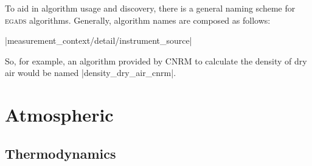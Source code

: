 \documentclass[a4paper,11pt]{report}
\newcommand{\egads}{\textsc{egads} }
\begin{document}
To aid in algorithm usage and discovery, there is a general naming scheme for \egads algorithms. Generally, algorithm names are composed as follows: 

|{measurement}_{context/detail/instrument}_{source}| 

So, for example, an algorithm provided by CNRM to calculate the density of dry air would be named |density_dry_air_cnrm|.




\part{Atmospheric}

\chapter{Thermodynamics}
























\end{document}
